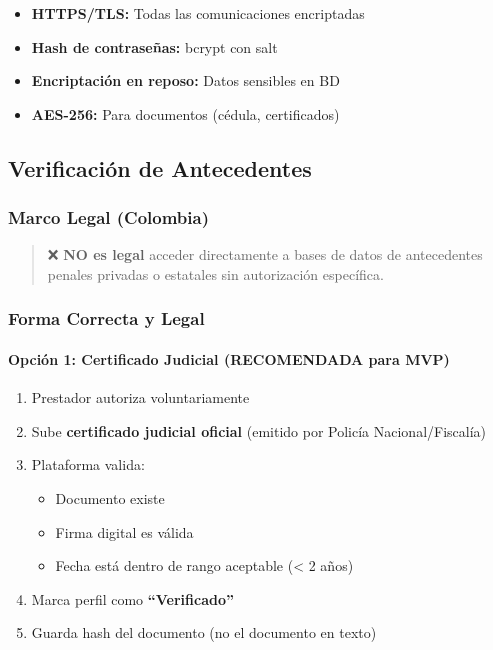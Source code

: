 \documentclass[12pt,a4paper,spanish]{article}
\begin{document}
\begin{itemize}
    \item \textbf{HTTPS/TLS:} Todas las comunicaciones encriptadas
    \item \textbf{Hash de contraseñas:} bcrypt con salt
    \item \textbf{Encriptación en reposo:} Datos sensibles en BD
    \item \textbf{AES-256:} Para documentos (cédula, certificados)
\end{itemize}

\subsection{Verificación de Antecedentes}

\subsubsection{Marco Legal (Colombia)}

\begin{quotation}
    ❌ \textbf{NO es legal} acceder directamente a bases de datos de antecedentes penales privadas o estatales sin autorización específica.
\end{quotation}

\subsubsection{Forma Correcta y Legal}

\paragraph{Opción 1: Certificado Judicial (RECOMENDADA para MVP)}

\begin{enumerate}
    \item Prestador autoriza voluntariamente
    \item Sube \textbf{certificado judicial oficial} (emitido por Policía Nacional/Fiscalía)
    \item Plataforma valida:
    \begin{itemize}
        \item Documento existe
        \item Firma digital es válida
        \item Fecha está dentro de rango aceptable (< 2 años)
    \end{itemize}
    \item Marca perfil como \textbf{``Verificado''}
    \item Guarda hash del documento (no el documento en texto)
\end{enumerate}
\end{document}
